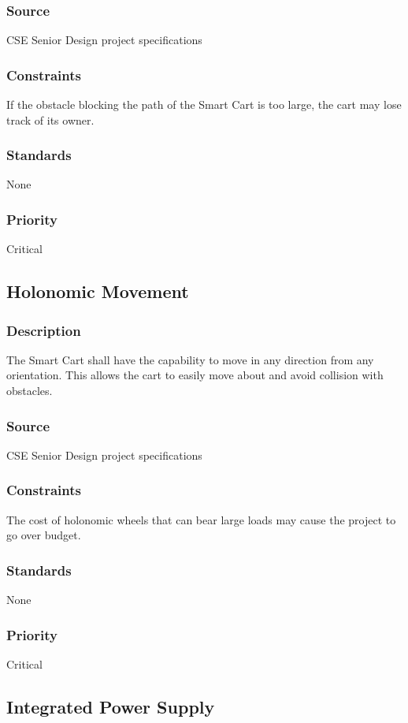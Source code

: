 \subsubsection{Source}
CSE Senior Design project specifications
\subsubsection{Constraints}
If the obstacle blocking the path of the Smart Cart is too large, the cart may lose track of its owner. 
\subsubsection{Standards}
None
\subsubsection{Priority}
Critical


\subsection{Holonomic Movement}
\subsubsection{Description}
The Smart Cart shall have the capability to move in any direction from any orientation. This allows the cart to easily move about and avoid collision with obstacles.
\subsubsection{Source}
CSE Senior Design project specifications
\subsubsection{Constraints}
The cost of holonomic wheels that can bear large loads may cause the project to go over budget.
\subsubsection{Standards}
None
\subsubsection{Priority}
Critical


\subsection{Integrated Power Supply}
